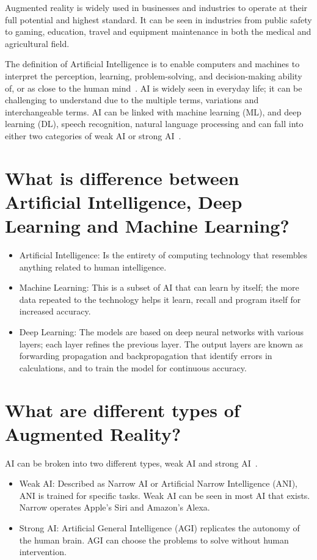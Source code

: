 Augmented reality is widely used in businesses and industries to operate at their full potential and highest standard. It can be seen in industries from public safety to gaming, education, travel and equipment maintenance in both the medical and agricultural field.  


The definition of Artificial Intelligence is to enable computers and machines to interpret the perception, learning, problem-solving, and decision-making ability of, or as close to the human mind~\cite{Reference16}. AI is widely seen in everyday life; it can be challenging to understand due to the multiple terms, variations and interchangeable terms. AI can be linked with machine learning (ML), and deep learning (DL), speech recognition, natural language processing and can fall into either two categories of weak AI or strong AI~\cite{Reference17}.

 \section {What is difference between Artificial Intelligence, Deep Learning and Machine Learning?}
 
 \begin{itemize}
  \item Artificial Intelligence: Is the entirety of computing technology that resembles anything related to human intelligence.
  \item Machine Learning: This is a subset of AI that can learn by itself; the more data repeated to the technology helps it learn, recall and program itself for increased accuracy.
  \item Deep Learning: The models are based on deep neural networks with various layers; each layer refines the previous layer. The output layers are known as forwarding propagation and backpropagation that identify errors in calculations, and to  train the model for continuous accuracy.
\end{itemize}

 \section{What are different types of Augmented Reality?}
 
 AI can be broken into two different types, weak AI and strong AI~\cite{Reference18}.
 
  \begin{itemize}
  \item Weak AI: Described as Narrow AI or Artificial Narrow Intelligence (ANI), ANI is trained for specific tasks. Weak AI can be seen in most AI that exists. Narrow operates Apple's Siri and Amazon's Alexa.
  \item Strong AI: Artificial General Intelligence (AGI) replicates the autonomy of the human brain. AGI can choose the problems to solve without human intervention. 
\end{itemize}

